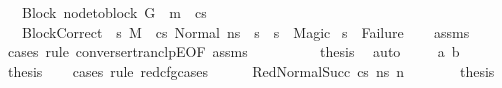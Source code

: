\begin{isabellebody}
\ \ \ Block{\isacharcolon}{\kern0pt}\ {\isachardoublequoteopen}node{\isacharunderscore}{\kern0pt}to{\isacharunderscore}{\kern0pt}block\ G\ {\isacharbang}{\kern0pt}\ m\ {\isacharequal}{\kern0pt}\ cs{\isachardoublequoteclose}\ \ \ \ \isanewline
\ \ \ BlockCorrect{\isacharcolon}{\kern0pt}\ {\isachardoublequoteopen}{\isasymAnd}\ s{\isacharprime}{\kern0pt}{\isacharprime}{\kern0pt}{\isachardot}{\kern0pt}\ M{\isacharcomma}{\kern0pt}{\isasymLambda}{\isacharcomma}{\kern0pt}{\isasymGamma}{\isacharcomma}{\kern0pt}{\isasymOmega}\ {\isasymturnstile}\ {\isasymlangle}cs{\isacharcomma}{\kern0pt}\ Normal\ n{\isacharunderscore}{\kern0pt}s{\isasymrangle}\ {\isacharbrackleft}{\kern0pt}{\isasymrightarrow}{\isacharbrackright}{\kern0pt}\ s{\isacharprime}{\kern0pt}{\isacharprime}{\kern0pt}\ {\isasymLongrightarrow}\ s{\isacharprime}{\kern0pt}{\isacharprime}{\kern0pt}\ {\isacharequal}{\kern0pt}\ Magic{\isachardoublequoteclose}\isanewline
{}\ {\isachardoublequoteopen}s{\isacharprime}{\kern0pt}\ {\isasymnoteq}\ Failure{\isachardoublequoteclose}\isanewline
%
\isadelimproof
\ \ %
\endisadelimproof
%
\isatagproof
{}\isamarkupfalse%
\ assms\isanewline
{}\isamarkupfalse%
\ {\isacharparenleft}{\kern0pt}cases\ rule{\isacharcolon}{\kern0pt}\ converse{\isacharunderscore}{\kern0pt}rtranclpE{}{\isacharbrackleft}{\kern0pt}OF\ assms{\isacharparenleft}{\kern0pt}{}{\isacharparenright}{\kern0pt}{\isacharbrackright}{\kern0pt}{\isacharparenright}{\kern0pt}\isanewline
\ \ \isamarkupfalse%
\ {}\isanewline
\ \ \isamarkupfalse%
\ \isamarkupfalse%
\ {\isacharquery}{\kern0pt}thesis\ \isamarkupfalse%
\ auto\isanewline
{}\isamarkupfalse%
\isanewline
\ \ \isamarkupfalse%
\ {\isacharparenleft}{\kern0pt}{}\ a\ b{\isacharparenright}{\kern0pt}\isanewline
\ \ \isamarkupfalse%
\ \isamarkupfalse%
\ {\isacharquery}{\kern0pt}thesis\isanewline
\ \ \isamarkupfalse%
\ {\isacharparenleft}{\kern0pt}cases\ rule{\isacharcolon}{\kern0pt}\ red{\isacharunderscore}{\kern0pt}cfg{\isachardot}{\kern0pt}cases{\isacharparenright}{\kern0pt}\isanewline
\ \ \ \ \isamarkupfalse%
\ {\isacharparenleft}{\kern0pt}RedNormalSucc\ cs\ ns{\isacharprime}{\kern0pt}\ n{\isacharprime}{\kern0pt}{\isacharparenright}{\kern0pt}\isanewline
\ \ \ \ \isamarkupfalse%
\ \isamarkupfalse%
\ {\isacharquery}{\kern0pt}thesis\ \isamarkupfalse%

\end{isabellebody}
